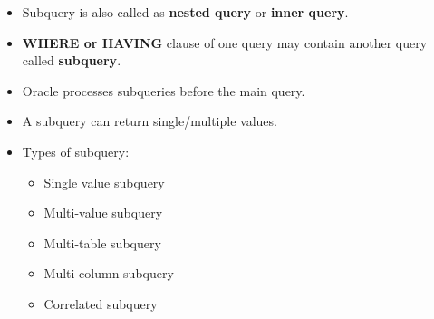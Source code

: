 \setlength{\columnsep}{3pt}
\begin{flushleft}

	\begin{itemize}
		\item Subquery is also called as \textbf{nested query} or \textbf{inner query}.
		\item \textbf{WHERE or HAVING} clause of one query may contain another query called \textbf{subquery}.
		\item Oracle processes subqueries before the main query.
		\item A subquery can return single/multiple values.
		\item Types of subquery:
		\begin{itemize}
			\item Single value subquery
			\item Multi-value subquery
			\item Multi-table subquery
			\item Multi-column subquery
			\item Correlated subquery
		\end{itemize}
	\end{itemize}	
	
\end{flushleft}

\newpage

